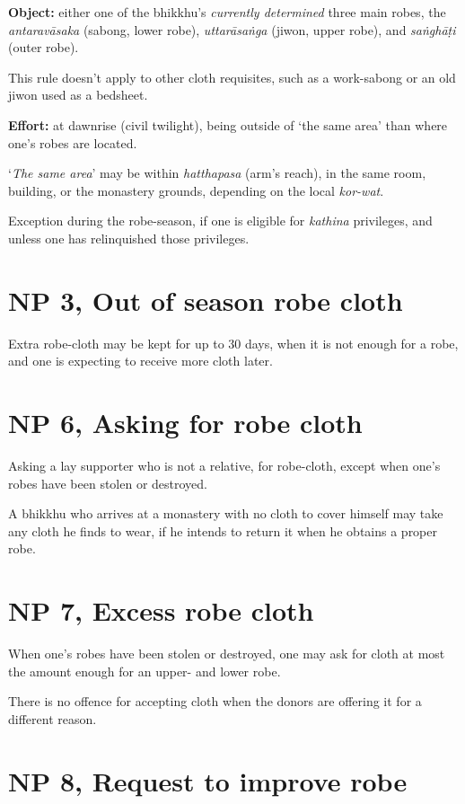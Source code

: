 \textbf{Object:} either one of the bhikkhu's \emph{currently determined}
three main robes, the \emph{antaravāsaka} (sabong, lower robe),
\emph{uttarāsaṅga} (jiwon, upper robe), and \emph{saṅghāṭi} (outer
robe).

This rule doesn't apply to other cloth requisites, such as a work-sabong
or an old jiwon used as a bedsheet.

\textbf{Effort:} at dawnrise (civil twilight), being outside of `the
same area' than where one's robes are located.

`\emph{The same area}' may be within \emph{hatthapasa} (arm's reach), in
the same room, building, or the monastery grounds, depending on the
local \emph{kor-wat}.

Exception during the robe-season, if one is eligible for \emph{kathina}
privileges, and unless one has relinquished those privileges.

\section{NP 3, Out of season robe cloth}

Extra robe-cloth may be kept for up to 30 days, when it is not enough
for a robe, and one is expecting to receive more cloth later.

\section{NP 6, Asking for robe cloth}

Asking a lay supporter who is not a relative, for robe-cloth, except
when one's robes have been stolen or destroyed.

A bhikkhu who arrives at a monastery with no cloth to cover himself may
take any cloth he finds to wear, if he intends to return it when he
obtains a proper robe.

\section{NP 7, Excess robe cloth}

When one's robes have been stolen or destroyed, one may ask for cloth at
most the amount enough for an upper- and lower robe.

There is no offence for accepting cloth when the donors are offering it
for a different reason.

\section{NP 8, Request to improve robe}

